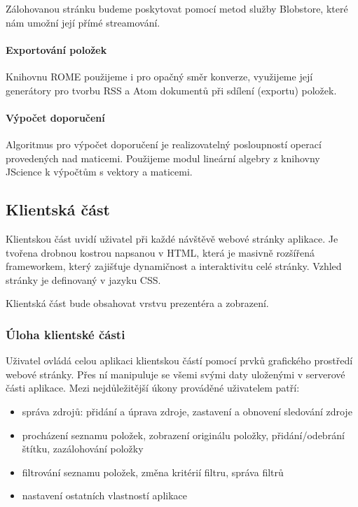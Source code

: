 Zálohovanou stránku budeme poskytovat pomocí metod služby Blobstore, které nám umožní její přímé streamování.

\paragraph{Exportování položek}
Knihovnu ROME použijeme i pro opačný směr konverze, využijeme její generátory pro tvorbu RSS a Atom dokumentů při sdílení (exportu) položek.

\paragraph{Výpočet doporučení}
Algoritmus pro výpočet doporučení je realizovatelný posloupností operací provedených nad maticemi.
Použijeme modul lineární algebry z knihovny JScience k výpočtům s vektory a maticemi.

\subsection{Klientská část}

Klientskou část uvidí uživatel při každé návštěvě webové stránky aplikace.
Je tvořena drobnou kostrou napsanou v HTML, která je masivně rozšířená  frameworkem, který zajišťuje dynamičnost a interaktivitu celé stránky.
Vzhled stránky je definovaný v jazyku CSS.

Klientská část bude obsahovat vrstvu prezentéra a zobrazení.

\subsubsection{Úloha klientské části}

Uživatel ovládá celou aplikaci klientskou částí pomocí prvků grafického prostředí webové stránky.
Přes ní manipuluje se všemi svými daty uloženými v serverové části aplikace.
Mezi nejdůležitější úkony prováděné uživatelem patří:
\begin{itemize}
	\item správa zdrojů: přidání a úprava zdroje, zastavení a obnovení sledování zdroje
	\item procházení seznamu položek, zobrazení originálu položky, přidání/odebrání štítku, zazálohování položky
	\item filtrování seznamu položek, změna kritérií filtru, správa filtrů
	\item nastavení ostatních vlastností aplikace
\end{itemize}

